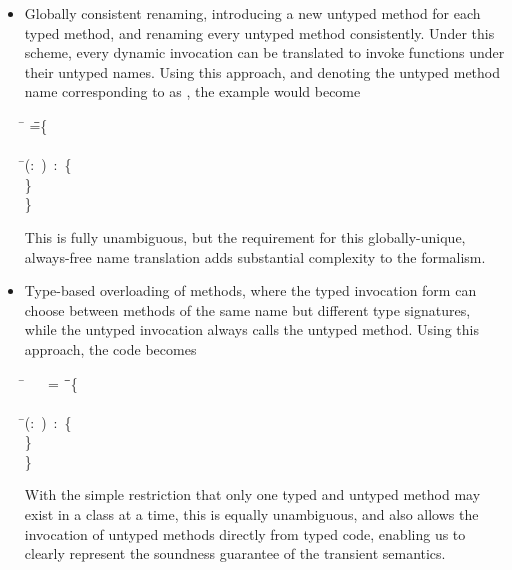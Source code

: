 \documentclass[a4paper,USenglish]{tex/lipics-v2016}
\begin{document}
\begin{itemize}
  \item Globally consistent renaming, introducing a new untyped method for each
  typed method, and renaming every untyped method consistently. Under this scheme,
  every dynamic invocation can be translated to invoke functions under their untyped
  names. Using this approach, and denoting the untyped method name corresponding to \m as 
  \mp, the example would become


\begin{tabbing}
\hspace{1cm}\K\HS\=
 \HS\HS\HS\HS\HS\HS\HS\HS\HS\WHERE\HS
  \K\HS =\HS \= \class\= \C \{\\
\>        \> \HS \Mdef{\m}\\
\>\>\HS \=\mp(\x:~\any)~:~\any \{ \\
\>\>\>\HS\HS\HS\SubCast{} \HS\}\\
   \>    \> \}
\end{tabbing}

This is fully unambiguous, but the requirement for this globally-unique, always-free
name translation adds substantial complexity to the formalism.
\item Type-based overloading of methods, where the typed invocation form can choose
between methods of the same name but different type signatures, while the untyped
invocation always calls the untyped method. Using this approach, the code becomes


\begin{tabbing}
\hspace{1cm}\K\HS\=
 \HS\HS\HS\HS\HS\WHERE~
  \K ~=~ \= \class\= \C \{\\
\> \any\any \> \HS \Mdef{\m}\\
\>\>\HS \=\mp(\x:~\any)~:~\any \{ \\
\>\>\>\HS\HS\HS\SubCast{} \HS\}\\
   \>    \> \}
\end{tabbing}

With the simple restriction that only one typed and untyped method may
exist in a class at a time, this is equally unambiguous, and also allows
the invocation of untyped methods directly from typed code, enabling us
to clearly represent the soundness guarantee of the transient semantics.

\end{itemize}
\end{document}
